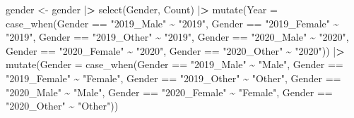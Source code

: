 \documentclass[
]{article}
\newenvironment{Shaded}{\begin{snugshade}}{\end{snugshade}}
\newcommand{\AttributeTok}[1]{\textcolor[rgb]{0.77,0.63,0.00}{#1}}
\newcommand{\ErrorTok}[1]{\textcolor[rgb]{0.64,0.00,0.00}{\textbf{#1}}}
\newcommand{\FunctionTok}[1]{\textcolor[rgb]{0.00,0.00,0.00}{#1}}
\newcommand{\NormalTok}[1]{#1}
\newcommand{\OtherTok}[1]{\textcolor[rgb]{0.56,0.35,0.01}{#1}}
\newcommand{\SpecialCharTok}[1]{\textcolor[rgb]{0.00,0.00,0.00}{#1}}
\newcommand{\StringTok}[1]{\textcolor[rgb]{0.31,0.60,0.02}{#1}}
\begin{document}
\begin{Shaded}
\begin{Highlighting}[]
\NormalTok{gender }\OtherTok{\textless{}{-}} 
\NormalTok{  gender }\SpecialCharTok{|}\ErrorTok{\textgreater{}}
  \FunctionTok{select}\NormalTok{(Gender, Count) }\SpecialCharTok{|}\ErrorTok{\textgreater{}}
  \FunctionTok{mutate}\NormalTok{(}\AttributeTok{Year =} 
           \FunctionTok{case\_when}\NormalTok{(Gender }\SpecialCharTok{==} \StringTok{"2019\_Male"} \SpecialCharTok{\textasciitilde{}} \StringTok{"2019"}\NormalTok{, }
\NormalTok{                     Gender }\SpecialCharTok{==} \StringTok{"2019\_Female"} \SpecialCharTok{\textasciitilde{}} \StringTok{"2019"}\NormalTok{,}
\NormalTok{                     Gender }\SpecialCharTok{==} \StringTok{"2019\_Other"} \SpecialCharTok{\textasciitilde{}} \StringTok{"2019"}\NormalTok{,}
\NormalTok{                     Gender }\SpecialCharTok{==} \StringTok{"2020\_Male"} \SpecialCharTok{\textasciitilde{}} \StringTok{"2020"}\NormalTok{, }
\NormalTok{                     Gender }\SpecialCharTok{==} \StringTok{"2020\_Female"} \SpecialCharTok{\textasciitilde{}} \StringTok{"2020"}\NormalTok{, }
\NormalTok{                     Gender }\SpecialCharTok{==} \StringTok{"2020\_Other"} \SpecialCharTok{\textasciitilde{}} \StringTok{"2020"}\NormalTok{)) }\SpecialCharTok{|}\ErrorTok{\textgreater{}}
  \FunctionTok{mutate}\NormalTok{(}\AttributeTok{Gender =} 
           \FunctionTok{case\_when}\NormalTok{(Gender }\SpecialCharTok{==} \StringTok{"2019\_Male"} \SpecialCharTok{\textasciitilde{}} \StringTok{"Male"}\NormalTok{, }
\NormalTok{                     Gender }\SpecialCharTok{==} \StringTok{"2019\_Female"} \SpecialCharTok{\textasciitilde{}} \StringTok{"Female"}\NormalTok{,}
\NormalTok{                     Gender }\SpecialCharTok{==} \StringTok{"2019\_Other"} \SpecialCharTok{\textasciitilde{}} \StringTok{"Other"}\NormalTok{,}
\NormalTok{                     Gender }\SpecialCharTok{==} \StringTok{"2020\_Male"} \SpecialCharTok{\textasciitilde{}} \StringTok{"Male"}\NormalTok{, }
\NormalTok{                     Gender }\SpecialCharTok{==} \StringTok{"2020\_Female"} \SpecialCharTok{\textasciitilde{}} \StringTok{"Female"}\NormalTok{,}
\NormalTok{                    Gender }\SpecialCharTok{==} \StringTok{"2020\_Other"} \SpecialCharTok{\textasciitilde{}} \StringTok{"Other"}\NormalTok{))}
\end{Highlighting}
\end{Shaded}
\end{document}
